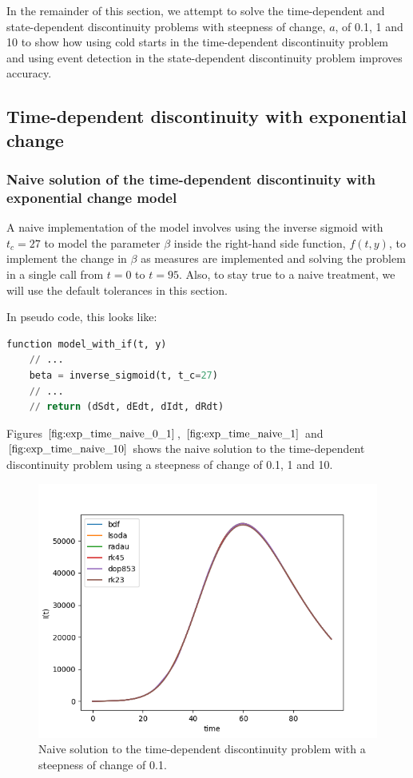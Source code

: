 In the remainder of this section, we attempt to solve the time-dependent and state-dependent discontinuity problems with steepness of change, $a$, of 0.1, 1 and 10 to show how using cold starts in the time-dependent discontinuity problem and using event detection in the state-dependent discontinuity problem improves accuracy.

\subsection{Time-dependent discontinuity with exponential change}

\subsubsection{Naive solution of the time-dependent discontinuity with exponential change model}
A naive implementation of the model involves using the inverse sigmoid with $t_c=27$ to model the parameter $\beta$ inside the right-hand side function, $f(t, y)$, to implement the change in $\beta$ as measures are implemented and solving the problem in a single call from $t=0$ to $t=95$. Also, to stay true to a naive treatment, we will use the default tolerances in this section. 

In pseudo code, this looks like:

\begin{minipage}{\linewidth}
\begin{lstlisting}[language=Python]
function model_with_if(t, y)
    // ...
    beta = inverse_sigmoid(t, t_c=27)
    // ...
    // return (dSdt, dEdt, dIdt, dRdt)
\end{lstlisting}
\end{minipage}

Figures $\ref{fig:exp_time_naive_0_1}$, $\ref{fig:exp_time_naive_1}$ and $\ref{fig:exp_time_naive_10}$ shows the naive solution to the time-dependent discontinuity problem using a steepness of change of 0.1, 1 and 10.

\begin{figure}[H]
\centering
\includegraphics[width=0.7\linewidth]{./figures/exp_time_naive_0_1}
\caption{Naive solution to the time-dependent discontinuity problem with a steepness of change of 0.1.}
\label{fig:exp_time_naive_0_1}
\end{figure}

